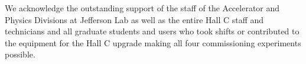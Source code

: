 \begin{acknowledgements}
  We acknowledge the outstanding support of the staff of the Accelerator and Physics Divisions at Jefferson Lab
  as well as the entire Hall C staff and technicians and all graduate students and users who took shifts or contributed
  to the equipment for the Hall C upgrade making all four commissioning experiments possible. 
\end{acknowledgements}
